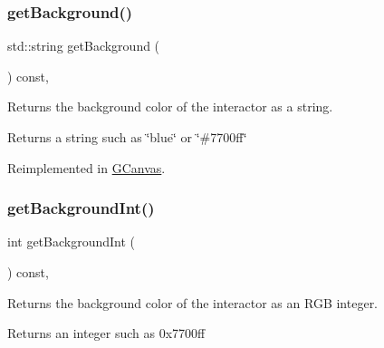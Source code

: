 \mbox{\label{classsgl_1_1GInteractor_a808e22cc1fdfbecf71ed8c64ef4600e0}} 
\subsubsection{\texorpdfstring{get\+Background()}{getBackground()}}
{\footnotesize\ttfamily std\+::string get\+Background (\begin{DoxyParamCaption}{ }\end{DoxyParamCaption}) const\hspace{0.3cm}{\ttfamily [virtual]}, {\ttfamily [inherited]}}



Returns the background color of the interactor as a string. 

\begin{DoxyReturn}{Returns}
a string such as \char`\"{}blue\char`\"{} or \char`\"{}\#7700ff\char`\"{} 
\end{DoxyReturn}


Reimplemented in \mbox{\hyperlink{classsgl_1_1GCanvas_a4a62c51b7244a7642b88065e3a07ae82}{G\+Canvas}}.

\mbox{\label{classsgl_1_1GInteractor_a9e827257a55cb8cf4d9de2ec6bcfd7a0}} 
\subsubsection{\texorpdfstring{get\+Background\+Int()}{getBackgroundInt()}}
{\footnotesize\ttfamily int get\+Background\+Int (\begin{DoxyParamCaption}{ }\end{DoxyParamCaption}) const\hspace{0.3cm}{\ttfamily [virtual]}, {\ttfamily [inherited]}}



Returns the background color of the interactor as an R\+GB integer. 

\begin{DoxyReturn}{Returns}
an integer such as 0x7700ff 
\end{DoxyReturn}


